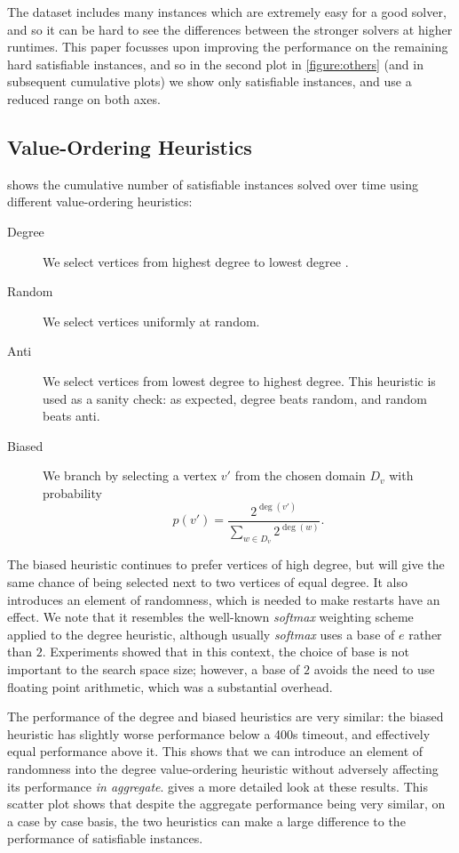 \documentclass[letterpaper]{article} %
\begin{document}
The dataset includes many instances which are extremely easy for a good solver, and so it can be
hard to see the differences between the stronger solvers at higher runtimes. This paper focusses
upon improving the performance on the remaining hard satisfiable instances, and so in the second
plot in \cref{figure:others} (and in subsequent cumulative plots) we show only satisfiable
instances, and use a reduced range on both axes.

\subsection{Value-Ordering Heuristics}

 shows the cumulative number of satisfiable instances
solved over time using different value-ordering heuristics:

\begin{description}
\item[Degree] We select vertices from highest degree to lowest degree
\cite{DBLP:conf/ijcai/McCreeshPT16}.

\item[Random] We select vertices uniformly at random.

\item[Anti] We select vertices from lowest degree to highest degree. This heuristic is used as
a sanity check: as expected, degree beats random, and random beats anti.

\item[Biased] We branch by selecting a vertex $v'$ from the chosen domain $D_v$ with
probability \[ p(v') = \frac{2^{\deg(v')}}{\sum_{w \in D_v}{2^{\deg(w)}}} \text{.} \]\end{description}

The biased heuristic continues to prefer vertices of high degree, but will give the same chance of
being selected next to two vertices of equal degree.  It also introduces an element of randomness,
which is needed to make restarts have an effect.  We note that it resembles the well-known
\emph{softmax} weighting scheme applied to the degree heuristic, although usually \emph{softmax}
uses a base of $e$ rather than $2$.  Experiments showed that in this context, the choice of base is
not important to the search space size; however, a base of $2$ avoids the need to use floating point
arithmetic, which was a substantial overhead.

The performance of the degree and biased heuristics are very similar: the
biased heuristic has slightly worse performance below a 400s timeout, and effectively equal
performance above it. This shows that we can introduce an element of randomness into the degree
value-ordering heuristic without adversely affecting its performance \emph{in aggregate}.
 gives a more detailed look at these results. This scatter plot
shows that despite the aggregate performance being very similar, on a case by case basis, the two
heuristics can make a large difference to the performance of satisfiable instances.
\end{document}

